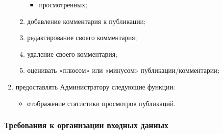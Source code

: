 \documentclass{bmstu-gost-7-32}
\begin{document}
\begin{enumerate}
\begin{enumerate}
\begin{itemize}
			\item просмотренных;
		\end{itemize}
		\item добавление комментария к публикации;
		\item редактирование своего комментария;
		\item удаление своего комментария;
		\item оценивать «плюсом» или «минусом» публикации/комментарии;
	\end{enumerate}
	\item предоставлять Администратору следующие функции:
	\begin{itemize}
		\item отображение статистики просмотров публикаций.
	\end{itemize}
\end{enumerate}

\subsubsection{Требования к организации входных данных}
\end{document}
